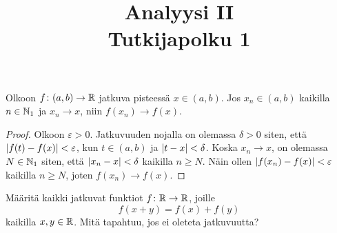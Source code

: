 \documentclass[11pt,a4paper]{amsart}
\title{Analyysi II\\Tutkijapolku 1}
\author{}
\date{}
\begin{document}

\begin{lemma}\label{lem:cont-seq}
  Olkoon \(f\colon (a,b) \to \mathbb{R}\) jatkuva pisteessä \(x \in (a,b)\).
  Jos \(x_n \in (a,b)\) kaikilla \(n \in \mathbb{N}_1\) ja \(x_n \to x\),
  niin \(f(x_n) \to f(x)\).
\end{lemma}

\begin{proof}
  Olkoon \(\varepsilon > 0\). Jatkuvuuden nojalla on olemassa
  \(\delta > 0\) siten, että \(\lvert f(t)-f(x)\rvert < \varepsilon\), kun
  \(t \in (a,b)\) ja \(\lvert t-x\rvert < \delta\).
  Koska \(x_n \to x\), on olemassa \(N \in \mathbb{N}_1\) siten, että
  \(\lvert x_n-x\rvert < \delta\) kaikilla \(n \geq N\). Näin ollen
  \(\lvert f(x_n)-f(x)\rvert < \varepsilon\) kaikilla \(n \geq N\),
  joten \(f(x_n) \to f(x)\).
\end{proof}

\begin{exercise}
  Määritä kaikki jatkuvat funktiot \(f\colon \mathbb{R} \to \mathbb{R}\), joille
  \begin{equation}\label{eq:add}
    f(x+y) = f(x) + f(y)
  \end{equation}
  kaikilla \(x,y \in \mathbb{R}\). Mitä tapahtuu, jos ei oleteta jatkuvuutta?
\end{exercise}
\end{document}
